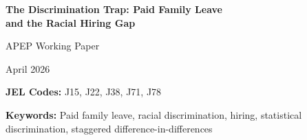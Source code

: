 \documentclass[12pt]{article}
\begin{document}
\begin{titlepage}
\begin{center}
\vspace*{0.5in}

{\LARGE\bfseries The Discrimination Trap: Paid Family Leave\\[4pt] and the Racial Hiring Gap}

\vspace{0.6in}

{\large APEP Working Paper}

\vspace{0.4in}

{\large April 2026}

\vspace{0.6in}

\begin{abstract}
\noindent Paid family leave (PFL) is designed to support workers, yet its effects on racial inequality in hiring remain unexplored. Using Quarterly Workforce Indicators microdata by race across 43 U.S.\ states from 2001 to 2023, I exploit the staggered adoption of state PFL mandates in a Callaway--Sant'Anna difference-in-differences framework. PFL reduces the Black-to-White hiring ratio by 12.3\%, driven entirely by a 13.6\% decline in Black new hires while White hiring is essentially unchanged. I call this the \textit{discrimination trap}: mandated leave raises the expected cost of hiring workers perceived as higher-leave-risk, and statistical discrimination falls disproportionately on Black applicants. Critically, the trap is avoidable. States with high benefit generosity ($\geq$75\% wage replacement) and statutory job protection show no adverse hiring effects, suggesting that sufficiently generous programs spread costs broadly enough to neutralize discriminatory screening.
\end{abstract}

\vspace{0.4in}

\noindent\textbf{JEL Codes:} J15, J22, J38, J71, J78

\vspace{0.15in}

\noindent\textbf{Keywords:} Paid family leave, racial discrimination, hiring, statistical discrimination, staggered difference-in-differences

\end{center}
\end{titlepage}
\end{document}
